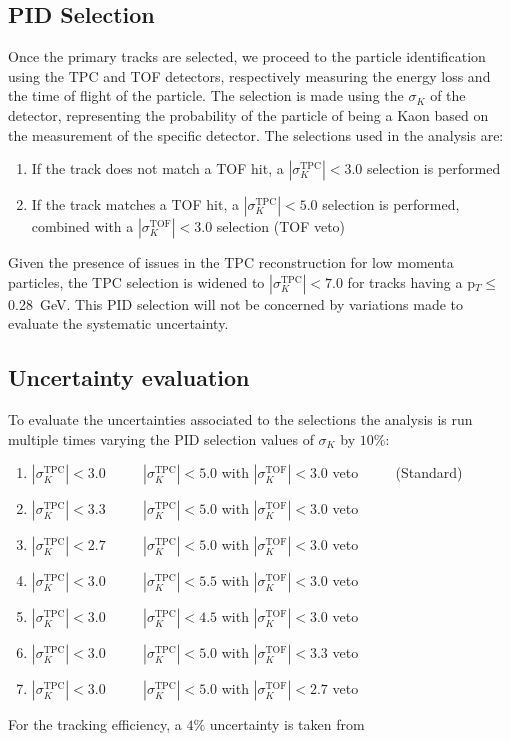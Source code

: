 \subsection{PID Selection}
Once the primary tracks are selected, we proceed to the particle identification using the TPC and TOF detectors, respectively measuring the energy loss and the time of flight of the particle. The selection is made using the $\sigma_K$ of the detector, representing the probability of the particle of being a Kaon based on the measurement of the specific detector. The selections used in the analysis are:
\begin{enumerate}
\item If the track does not match a TOF hit, a $|\sigma_K^{\text{TPC}}| < 3.0$ selection is performed
\item If the track matches a TOF hit, a $|\sigma_K^{\text{TPC}}| < 5.0$ selection is performed, combined with a $|\sigma_K^{\text{TOF}}| < 3.0$ selection (TOF veto)
\end{enumerate}
Given the presence of issues in the TPC reconstruction for low momenta particles, the TPC selection is widened to $|\sigma_K^{\text{TPC}}| < 7.0$ for tracks having a 
p$_{T} \leq$ \SI{0.28}{\giga\electronvolt}. This PID selection will not be concerned by variations made to evaluate the systematic uncertainty.
\subsection{Uncertainty evaluation}
To evaluate the uncertainties associated to the selections the analysis is run multiple times varying the PID selection values of $\sigma_K$ by $10\%$:
\begin{enumerate}
\item $|\sigma_K^{\text{TPC}}| < 3.0$ $\qquad$ $|\sigma_K^{\text{TPC}}| < 5.0$ with $|\sigma_K^{\text{TOF}}| < 3.0$ veto $\qquad$ (Standard)
\item $|\sigma_K^{\text{TPC}}| < 3.3$ $\qquad$ $|\sigma_K^{\text{TPC}}| < 5.0$ with $|\sigma_K^{\text{TOF}}| < 3.0$ veto 
\item $|\sigma_K^{\text{TPC}}| < 2.7$ $\qquad$ $|\sigma_K^{\text{TPC}}| < 5.0$ with $|\sigma_K^{\text{TOF}}| < 3.0$ veto 
\item $|\sigma_K^{\text{TPC}}| < 3.0$ $\qquad$ $|\sigma_K^{\text{TPC}}| < 5.5$ with $|\sigma_K^{\text{TOF}}| < 3.0$ veto
\item $|\sigma_K^{\text{TPC}}| < 3.0$ $\qquad$ $|\sigma_K^{\text{TPC}}| < 4.5$ with $|\sigma_K^{\text{TOF}}| < 3.0$ veto
\item $|\sigma_K^{\text{TPC}}| < 3.0$ $\qquad$ $|\sigma_K^{\text{TPC}}| < 5.0$ with $|\sigma_K^{\text{TOF}}| < 3.3$ veto
\item $|\sigma_K^{\text{TPC}}| < 3.0$ $\qquad$ $|\sigma_K^{\text{TPC}}| < 5.0$ with $|\sigma_K^{\text{TOF}}| < 2.7$ veto
\end{enumerate}
For the tracking efficiency, a $4\%$ uncertainty is taken from \cite{PrevPub}

